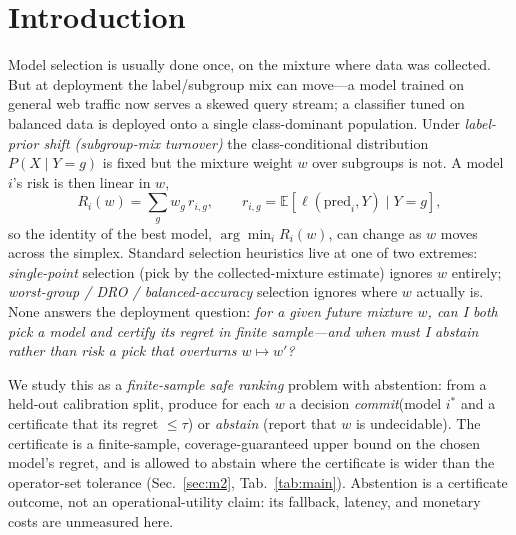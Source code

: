 \documentclass{article}
\begin{document}
\section{Introduction}
\label{sec:intro}

Model selection is usually done once, on the mixture where data was collected. But at
deployment the label/subgroup mix can move---a model trained on general web traffic now
serves a skewed query stream; a classifier tuned on balanced data is deployed onto a single
class-dominant population. Under \emph{label-prior shift (subgroup-mix turnover)} the
class-conditional distribution $P(X\mid Y{=}g)$ is fixed but the mixture weight $w$ over
subgroups is not. A model $i$'s risk is then linear in $w$,
\begin{equation}
  R_i(w)=\sum_{g} w_g\, r_{i,g},\qquad r_{i,g}=\mathbb{E}[\ell(\text{pred}_i, Y)\mid Y{=}g],
  \label{eq:linear}
\end{equation}
so the identity of the best model, $\arg\min_i R_i(w)$, can change as $w$ moves across the
simplex. Standard selection heuristics live at one of two extremes: \emph{single-point}
selection (pick by the collected-mixture estimate) ignores $w$ entirely; \emph{worst-group /
DRO / balanced-accuracy} selection ignores where $w$ actually is. None answers the
deployment question: \emph{for a given future mixture $w$, can I both pick a model and
certify its regret in finite sample---and when must I abstain rather than risk a pick that
overturns $w\mapsto w'$?}

We study this as a \emph{finite-sample safe ranking} problem with abstention: from a held-out
calibration split, produce
for each $w$ a decision \emph{commit}(model $i^*$ and a certificate that its regret
$\le\tau$) or \emph{abstain} (report that $w$ is undecidable). The certificate is a
finite-sample, coverage-guaranteed upper bound on the chosen model's regret, and is allowed
to abstain where the certificate is wider than the operator-set tolerance
(Sec.~\ref{sec:m2}, Tab.~\ref{tab:main}).  Abstention is a certificate outcome, not an
operational-utility claim: its fallback, latency, and monetary costs are unmeasured here.
\end{document}

